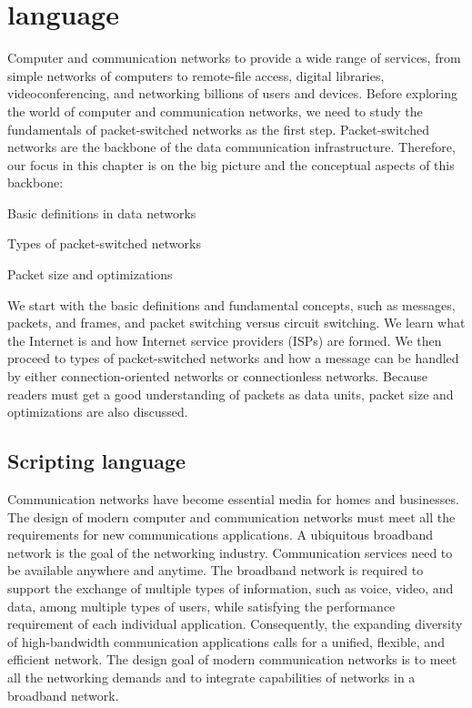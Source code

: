 \section{language}
Computer and communication networks to provide a wide range of services, from simple networks of computers to remote-file access, digital libraries, videoconferencing, and networking billions of users and devices. Before exploring the world of computer and communication networks, we need to study the fundamentals of packet-switched networks as the first step. Packet-switched networks are the backbone of the data communication infrastructure. Therefore, our focus in this chapter is on the big picture and the conceptual aspects of this backbone:

Basic definitions in data networks

Types of packet-switched networks

Packet size and optimizations

We start with the basic definitions and fundamental concepts, such as messages, packets, and frames, and packet switching versus circuit switching. We learn what the Internet is and how Internet service providers (ISPs) are formed. We then proceed to types of packet-switched networks and how a message can be handled by either connection-oriented networks or connectionless networks. Because readers must get a good understanding of packets as data units, packet size and optimizations are also discussed.

\subsection{Scripting language}
Communication networks have become essential media for homes and businesses. The design of modern computer and communication networks must meet all the requirements for new communications applications. A ubiquitous broadband network is the goal of the networking industry. Communication services need to be available anywhere and anytime. The broadband network is required to support the exchange of multiple types of information, such as voice, video, and data, among multiple types of users, while satisfying the performance requirement of each individual application. Consequently, the expanding diversity of high-bandwidth communication applications calls for a unified, flexible, and efficient network. The design goal of modern communication networks is to meet all the networking demands and to integrate capabilities of networks in a broadband network.


